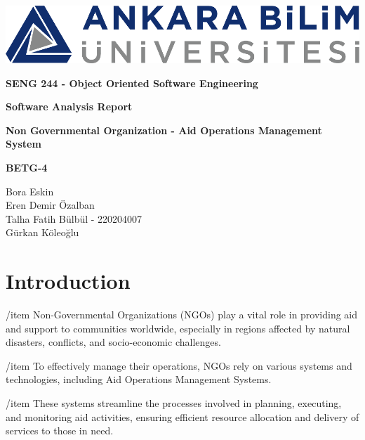 \documentclass[a4paper,12pt]{report}
\begin{document}
	\begin{titlepage}
		\begin{center}
			\includegraphics{ankara_bilim.png}
		\end{center}
		\vspace{1cm}
		\begin{center}
			\LARGE
			\textbf{SENG 244 - Object Oriented Software Engineering}
		\end{center}
		\vspace{1cm}
		\begin{center}
			\Large
			\textbf{Software Analysis Report}
		\end{center}
		\vspace{1cm}
		\begin{center}
			\Large
			\textbf{Non Governmental Organization - Aid Operations Management System}
		\end{center}
		\vspace{2cm}
		\begin{center}
			\large
			\textbf{BETG-4}
		\end{center}
		\vspace{1cm}
		\begin{center}
			\large
			Bora Eskin\\
			Eren Demir Özalban\\
			Talha Fatih Bülbül - 220204007\\
			Gürkan Köleoğlu
		\end{center}
	\end{titlepage}
	\tableofcontents
	\chapter{Introduction}
 		/item Non-Governmental Organizations (NGOs) play a vital role in providing aid and support to communities worldwide, especially in regions affected by natural disasters, conflicts, and socio-economic challenges. 
   		
     		/item To effectively manage their operations, NGOs rely on various systems and technologies, including Aid Operations Management Systems. 
     		
       		/item These systems streamline the processes involved in planning, executing, and monitoring aid activities, ensuring efficient resource allocation and delivery of services to those in need.
\end{document}
